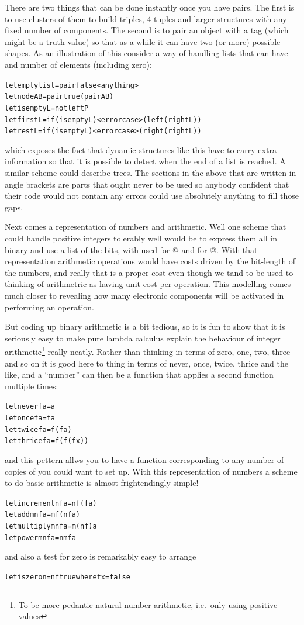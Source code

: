 There are two things that can be done instantly once you have pairs. The
first is to use clusters of them to build triples, 4-tuples and
larger structures with any fixed number of components. The second is
to pair an object with a tag (which might be a truth value) so that
as a while it can have two (or more) possible shapes. As an
illustration of this consider a way of handling lists that can have
and number of elements (including zero):
\begin{alltt}
   let emptylist = pair false <anything>
   let node A B = pair true (pair A B)
   let isempty L = not left P
   let first L = if (isempty L) <error case> (left (right L))
   let rest L = if (isempty L) <error case> (right (right L))
\end{alltt}
which exposes the fact that dynamic structures like this have
to carry extra information so that it is possible to detect when
the end of a list is reached. A similar scheme could describe trees.
The sections in the above that are written in angle brackets are
parts that ought never to be used so anybody confident that their
code would not contain any errors could use absolutely anything
to fill those gaps.

Next comes a representation of numbers and arithmetic. Well one
scheme that could handle positive integers tolerably well would be to
express them all in binary and use a list of the bits, with \verb@true@
used for @ and \verb@false@ for @. With that representation
arithmetic operations would have costs driven by the bit-length of
the numbers, and really that is a proper cost even though we tand to
be used to thinking of arithmetric as having unit cost per operation. This
modelling comes much closer to revealing how many electronic components
will be activated in performing an operation.

But coding up binary arithmetic is a bit tedious, so it is fun to show that
it is seriously easy to make pure lambda calculus explain the behaviour
of integer arithmetic\footnote{To be more pedantic natural number
arithmetic, i.e.\ only using positive values} really neatly.
Rather than thinking in terms of zero, one, two, three and so on it
is good here to thing in terms of never, once, twice, thrice and the like,
and a ``number'' can then be a function that applies a second function
multiple times:
\begin{alltt}
   let never f a = a
   let once f a = f a
   let twice f a = f (f a)
   let thrice f a = f (f (f x))
\end{alltt}
and this pettern allws you to have a function corresponding to any
number of copies of \verb@f@ you could want to set up. With this
representation of numbers a scheme to do basic arithmetic is almost
frightendingly simple!
\begin{alltt}
   let increment n f a = n f (f a)
   let add m n f a = m f (n f a)
   let multiply m n f a = m (n f) a
   let power m n f a = n m f a
\end{alltt}
and also a test for zero is remarkably easy to arrange
\begin{alltt}
   let iszero n = n f true where f x = false
\end{alltt}

